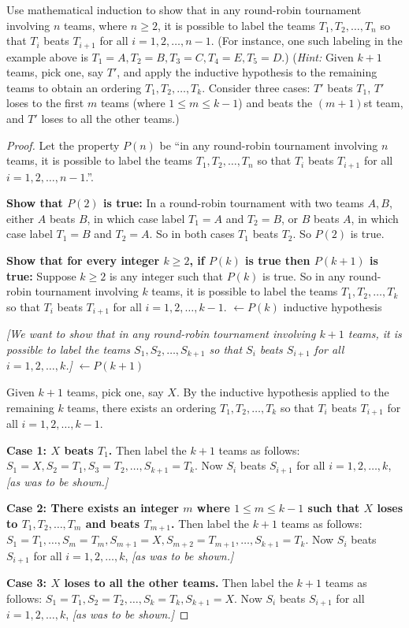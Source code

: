 \documentclass[14pt]{extarticle}
\newcommand{\from}{\leftarrow}
\newcommand{\cy}{\color{cyan}}
\begin{document}
Use mathematical induction to show that in any round-robin tournament involving $n$ teams, where $n \geq 2$, it is possible to label the teams $T_1, T_2, \ldots, T_n$ so that $T_i$ beats $T_{i + 1}$ for all $i = 1, 2, \ldots, n - 1$. (For instance, one such labeling in the example above is $T_1 = A, T_2 = B, T_3 = C, T_4 = E, T_5 = D$.) ({\it Hint:} Given $k+1$ teams, pick one, say $T'$, and apply the inductive hypothesis to the remaining teams to obtain an ordering $T_1, T_2, \ldots, T_k$. Consider three cases: $T'$ beats $T_1$, $T'$ loses to the first $m$ teams (where $1 \leq m \leq k - 1$) and beats the $(m + 1)$st team, and $T'$ loses to all the other teams.)

\begin{proof}
Let the property $P(n)$ be ``in any round-robin tournament involving $n$ teams, it is possible to label the teams $T_1, T_2, \ldots, T_n$ so that $T_i$ beats $T_{i + 1}$ for all $i = 1, 2, \ldots, n - 1$.''.

{\bf Show that $P(2)$ is true:} In a round-robin tournament with two teams $A, B$, either $A$ beats $B$, in which case label $T_1 = A$ and $T_2 = B$, or $B$ beats $A$, in which case label $T_1 = B$ and $T_2 = A$. So in both cases $T_1$ beats $T_2$. So $P(2)$ is true.

{\bf Show that for every integer $k \geq 2$, if $P(k)$ is true then $P(k+1)$ is true:} Suppose $k \geq 2$ is any integer such that $P(k)$ is true. So in any round-robin tournament involving $k$ teams, it is possible to label the teams $T_1, T_2, \ldots, T_k$ so that $T_i$ beats $T_{i + 1}$ for all $i = 1, 2, \ldots, k - 1$. {\cy $\from P(k)$ inductive hypothesis}

{\it [We want to show that in any round-robin tournament involving $k+1$ teams, it is possible to label the teams $S_1, S_2, \ldots, S_{k+1}$ so that $S_i$ beats $S_{i + 1}$ for all $i = 1, 2, \ldots, k$.]} {\cy $\from P(k+1)$}

Given $k+1$ teams, pick one, say $X$. By the inductive hypothesis applied to the remaining $k$ teams, there exists an ordering $T_1, T_2, \ldots, T_k$ so that $T_i$ beats $T_{i + 1}$ for all $i = 1, 2, \ldots, k - 1$.

{\bf Case 1: $X$ beats $T_1$.} Then label the $k+1$ teams as follows: $S_1 = X, S_2 = T_1, S_3 = T_2, \ldots, S_{k+1} = T_k$. Now $S_i$ beats $S_{i + 1}$ for all $i = 1, 2, \ldots, k$, {\it [as was to be shown.]}

{\bf Case 2: There exists an integer $m$ where $1 \leq m \leq k - 1$ such that $X$ loses to $T_1, T_2, \ldots, T_m$ and beats $T_{m + 1}$.} Then label the $k+1$ teams as follows: $S_1 = T_1, \ldots, S_m = T_m, S_{m+1} = X, S_{m+2} = T_{m+1}, \ldots, S_{k+1} = T_k$. Now $S_i$ beats $S_{i + 1}$ for all $i = 1, 2, \ldots, k$, {\it [as was to be shown.]}

{\bf Case 3: $X$ loses to all the other teams.} Then label the $k+1$ teams as follows: $S_1 = T_1, S_2 = T_2, \ldots, S_k = T_k, S_{k+1} = X$. Now $S_i$ beats $S_{i + 1}$ for all $i = 1, 2, \ldots, k$, {\it [as was to be shown.]}
\end{proof}
\end{document}
